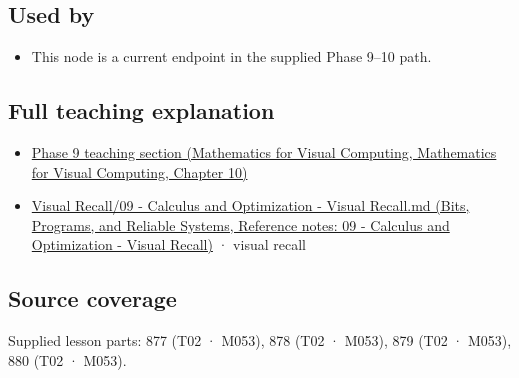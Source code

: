 \subsection{Used by}\label{appendix-2c2df8345991-used-by}

\begin{itemize}
\tightlist
\item
  This node is a current endpoint in the supplied Phase 9--10 path.
\end{itemize}

\subsection{Full teaching explanation}\label{appendix-2c2df8345991-full-teaching-explanation}

\begin{itemize}
\tightlist
\item
  \href{../02-Mathematics-for-Visual-Computing/main.pdf\#nameddest=02-foundations-ii-ch026-optimization-and-inverse-problems}{Phase 9 teaching section (Mathematics for Visual Computing, Mathematics for Visual Computing, Chapter 10)}
\item
  \href{../01-Bits-Programs-and-Reliable-Systems/main.pdf\#nameddest=appendix-adf48f5dc5c1}{Visual Recall/09 - Calculus and Optimization - Visual Recall.md (Bits, Programs, and Reliable Systems, Reference notes: 09 - Calculus and Optimization - Visual Recall)} · visual recall
\end{itemize}

\subsection{Source coverage}\label{appendix-2c2df8345991-source-coverage}

Supplied lesson parts: 877 (T02 · M053), 878 (T02 · M053), 879 (T02 · M053), 880 (T02 · M053).

